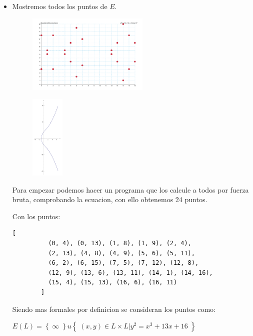 \documentclass[12pt, fleqn]{report}                             %
\theoremstyle{break}                                            %
\newcommand{\Set}[1]            {\left\{ \; #1 \; \right\}}     %
\begin{document}
  \begin{itemize}
    \item Mostremos todos los puntos de $E$.
    
      \begin{figure}[h]
        \centering
        \includegraphics[width=0.55\textwidth]{3P1}
      \end{figure}

      \begin{figure}[h]
        \centering
        \includegraphics[width=0.15\textwidth]{3P2}
      \end{figure}
    
      Para empezar podemos hacer un programa que los calcule a todos
      por fuerza bruta, comprobando la ecuacion, con ello obtenemos
      24 puntos.

      

      Con los puntos:
      \begin{lstlisting}[gobble=8]
        [
          (0, 4), (0, 13), (1, 8), (1, 9), (2, 4), 
          (2, 13), (4, 8), (4, 9), (5, 6), (5, 11), 
          (6, 2), (6, 15), (7, 5), (7, 12), (12, 8), 
          (12, 9), (13, 6), (13, 11), (14, 1), (14, 16), 
          (15, 4), (15, 13), (16, 6), (16, 11)
        ]
      \end{lstlisting}

      Siendo mas formales por definicion se consideran 
      los puntos como:
      
      $E(L) 
        = \Set{\infty} u \Set{ (x, y) \in L \times L | 
        y^2 = x^3 + 13x + 16}$


\end{itemize}
\end{document}
